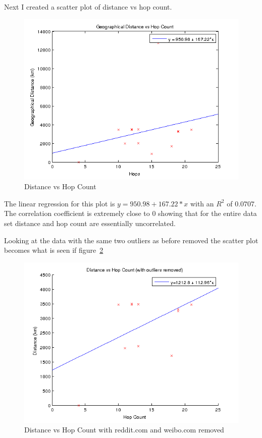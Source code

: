 \documentclass{article}
\begin{document}
Next I created a scatter plot of distance vs hop count.

\FloatBarrier
\begin{figure}[h!]
  \includegraphics{distance_vs_hop_count1_legend.png}
  \caption{Distance vs Hop Count}
  \label{fig:scatter3}
\end{figure}
\FloatBarrier

The linear regression for this plot is $y = 950.98 + 167.22*x$ with an $R^2$ of $0.0707$. The correlation coefficient is extremely close to 0 showing that for the entire data set distance and hop count are essentially uncorrelated.

Looking at the data with the same two outliers as before removed the scatter plot becomes what is seen if figure~\ref{fig:scatter4}

\FloatBarrier
\begin{figure}[h!]
  \includegraphics{distance_vs_hop_count_no_outliers.png}
  \caption{Distance vs Hop Count with reddit.com and weibo.com removed}
  \label{fig:scatter4}
\end{figure}
\FloatBarrier
\end{document}
